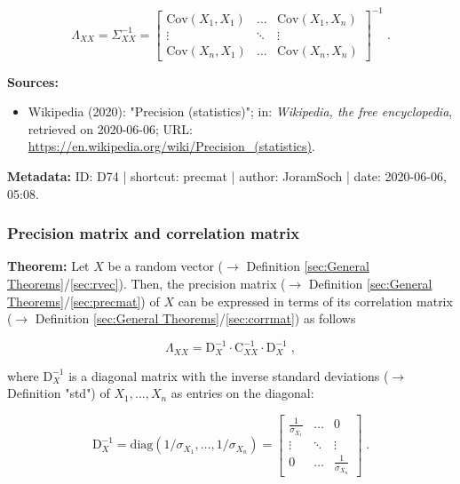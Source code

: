 \documentclass[a4paper,12pt,twoside]{book}
\begin{document}
\begin{equation} \label{eq:precmat-corrmat}
\Lambda_{XX} = \Sigma_{XX}^{-1} =
\begin{bmatrix}
\mathrm{Cov}(X_1,X_1) & \ldots & \mathrm{Cov}(X_1,X_n) \\
\vdots & \ddots & \vdots \\
\mathrm{Cov}(X_n,X_1) & \ldots & \mathrm{Cov}(X_n,X_n)
\end{bmatrix}^{-1} \; .
\end{equation}


\vspace{1em}
\textbf{Sources:}
\begin{itemize}
\item Wikipedia (2020): "Precision (statistics)"; in: \textit{Wikipedia, the free encyclopedia}, retrieved on 2020-06-06; URL: \url{https://en.wikipedia.org/wiki/Precision_(statistics)}.
\end{itemize}


\vspace{1em}
\textbf{Metadata:} ID: D74 | shortcut: precmat | author: JoramSoch | date: 2020-06-06, 05:08.
\vspace{1em}



\subsubsection[\textbf{Precision matrix and correlation matrix}]{Precision matrix and correlation matrix} \label{sec:precmat-corrmat}
\setcounter{equation}{0}

\textbf{Theorem:} Let $X$ be a random vector ($\rightarrow$ Definition \ref{sec:General Theorems}/\ref{sec:rvec}). Then, the precision matrix ($\rightarrow$ Definition \ref{sec:General Theorems}/\ref{sec:precmat}) of $X$ can be expressed in terms of its correlation matrix ($\rightarrow$ Definition \ref{sec:General Theorems}/\ref{sec:corrmat}) as follows

\begin{equation} \label{eq:precmat-corrmat-precmat-corrmat}
\Lambda_{XX} = \mathrm{D}_X^{-1} \cdot \mathrm{C}_{XX}^{-1} \cdot \mathrm{D}_X^{-1} \; ,
\end{equation}

where $\mathrm{D}_X^{-1}$ is a diagonal matrix with the inverse standard deviations ($\rightarrow$ Definition "std") of $X_1, \ldots, X_n$ as entries on the diagonal:

\begin{equation} \label{eq:precmat-corrmat-invdiagmat}
\mathrm{D}_X^{-1} = \mathrm{diag}(1/\sigma_{X_1},\ldots,1/\sigma_{X_n}) =
\begin{bmatrix}
\frac{1}{\sigma_{X_1}} & \ldots & 0 \\
\vdots & \ddots & \vdots \\
0 & \ldots & \frac{1}{\sigma_{X_n}}
\end{bmatrix} \; .
\end{equation}
\end{document}
